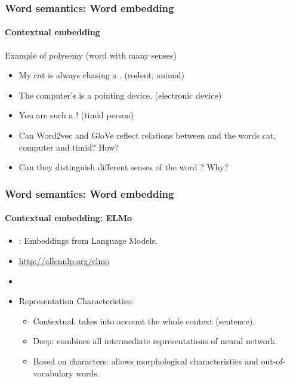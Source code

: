 \documentclass[xcolor=table]{beamer}
\begin{document}
\begin{frame}
\frametitle{Word semantics: Word embedding}
\framesubtitle{Contextual embedding}

\begin{exampleblock}{Example of polysemy (word with many senses)}
	\begin{itemize}
		\item My cat is always chasing a . (rodent, animal)
		\item The computer's  is a pointing device. (electronic device)
		\item You are such a ! (timid person)
	\end{itemize}
\end{exampleblock}

\begin{itemize}
	\item Can Word2vec and GloVe reflect relations between  and the words cat, computer and timid? How?
	\item Can they distinguish different senses of the word ? Why?
\end{itemize}

\end{frame}

\begin{frame}
\frametitle{Word semantics: Word embedding}
\framesubtitle{Contextual embedding: ELMo}

\begin{minipage}{.65\textwidth}
\begin{itemize}
	\item {}: Embeddings from Language Models.
	\item \url{http://allennlp.org/elmo}
	\item \cite{2018-peters-al}
	\item Representation Characteristics:
	\begin{itemize}
		\item Contextual: takes into account the whole context (sentence).
		\item Deep: combines all intermediate representations of neural network.
		\item Based on characters: allows morphological characteristics and out-of-vocabulary words.
	\end{itemize}
\end{itemize}
\end{minipage}
\begin{minipage}{.33\textwidth}
	\vspace{1.8cm}
\end{minipage}
	
\end{frame}
\end{document}
